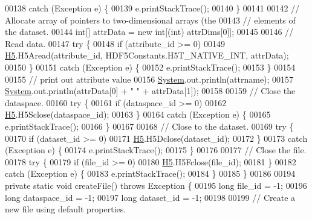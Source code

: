 \begin{DoxyCode}
00138         \textcolor{keywordflow}{catch} (Exception e) \{
00139             e.printStackTrace();
00140         \}
00141 
00142         \textcolor{comment}{// Allocate array of pointers to two-dimensional arrays (the}
00143         \textcolor{comment}{// elements of the dataset.}
00144         \textcolor{keywordtype}{int}[] attrData = \textcolor{keyword}{new} \textcolor{keywordtype}{int}[(int) attrDims[0]];
00145 
00146         \textcolor{comment}{// Read data.}
00147         \textcolor{keywordflow}{try} \{
00148             \textcolor{keywordflow}{if} (attribute\_id >= 0)
00149                 \hyperlink{namespace_h5}{H5}.H5Aread(attribute\_id, HDF5Constants.H5T\_NATIVE\_INT, attrData);
00150         \}
00151         \textcolor{keywordflow}{catch} (Exception e) \{
00152             e.printStackTrace();
00153         \}
00154 
00155         \textcolor{comment}{// print out attribute value}
00156         \hyperlink{namespace_system}{System}.out.println(attrname);
00157         \hyperlink{namespace_system}{System}.out.println(attrData[0] + \textcolor{stringliteral}{"  "} + attrData[1]);
00158 
00159         \textcolor{comment}{// Close the dataspace.}
00160         \textcolor{keywordflow}{try} \{
00161             \textcolor{keywordflow}{if} (dataspace\_id >= 0)
00162                 \hyperlink{namespace_h5}{H5}.H5Sclose(dataspace\_id);
00163         \}
00164         \textcolor{keywordflow}{catch} (Exception e) \{
00165             e.printStackTrace();
00166         \}
00167 
00168         \textcolor{comment}{// Close to the dataset.}
00169         \textcolor{keywordflow}{try} \{
00170             \textcolor{keywordflow}{if} (dataset\_id >= 0)
00171                 \hyperlink{namespace_h5}{H5}.H5Dclose(dataset\_id);
00172         \}
00173         \textcolor{keywordflow}{catch} (Exception e) \{
00174             e.printStackTrace();
00175         \}
00176 
00177         \textcolor{comment}{// Close the file.}
00178         \textcolor{keywordflow}{try} \{
00179             \textcolor{keywordflow}{if} (file\_id >= 0)
00180                 \hyperlink{namespace_h5}{H5}.H5Fclose(file\_id);
00181         \}
00182         \textcolor{keywordflow}{catch} (Exception e) \{
00183             e.printStackTrace();
00184         \}
00185     \}
00186 
00194     \textcolor{keyword}{private} \textcolor{keyword}{static} \textcolor{keywordtype}{void} createFile() throws Exception \{
00195         \textcolor{keywordtype}{long} file\_id = -1;
00196         \textcolor{keywordtype}{long} dataspace\_id = -1;
00197         \textcolor{keywordtype}{long} dataset\_id = -1;
00198 
00199         \textcolor{comment}{// Create a new file using default properties.}

\end{DoxyCode}
